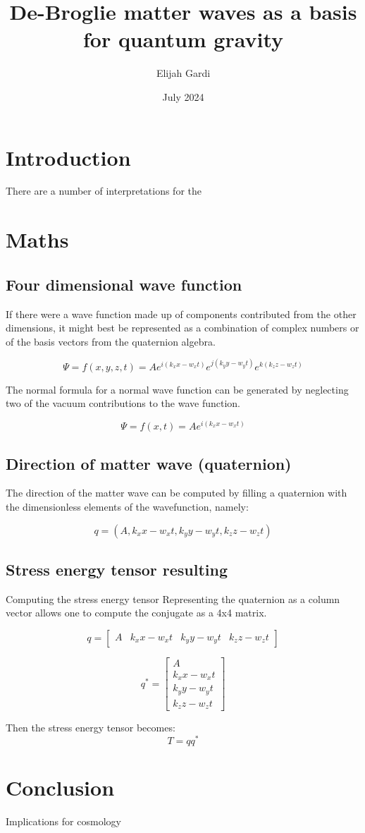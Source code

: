\documentclass{article}
\title{De-Broglie matter waves as a basis for quantum gravity}
\author{Elijah Gardi}
\date{July 2024}
\begin{document}
\maketitle

\section{Introduction}
There are a number of interpretations for the 

\section{Maths}
\subsection{Four dimensional wave function}

If there were a wave function made up of components contributed from the other dimensions, it might best be represented as a combination of complex numbers or of the basis vectors from the quaternion algebra.

$$\Psi=f(x,y,z,t)=A e^{i(k_x x-w_x t)} e^{j(k_y y-w_y t)} e^{k(k_z z-w_z t)}$$

The normal formula for a normal wave function can be generated by neglecting two of the vacuum contributions to the wave function.

$$\Psi=f(x,t)=A e^{i(k_x x-w_x t)}$$
\subsection{Direction of matter wave (quaternion)}
The direction of the matter wave can be computed by filling a quaternion with the dimensionless elements of the wavefunction, namely:

$$q=(A, k_x x-w_x t, k_y y-w_y t, k_z z-w_z t)$$
\subsection{Stress energy tensor resulting}
Computing the stress energy tensor
Representing the quaternion as a column vector allows one to compute the conjugate as a 4x4 matrix.

$$q=
\left[
\begin{matrix}
A&k_x x-w_x t&k_y y-w_y t&k_z z-w_z t
\end{matrix}
\right]
$$

$$q^*=
\left[
\begin{matrix}
A\\k_x x-w_x t\\k_y y-w_y t\\k_z z-w_z t
\end{matrix}
\right]
$$

Then the stress energy tensor becomes:
$$T=qq^*$$
\section{Conclusion}
Implications for cosmology
\end{document}

